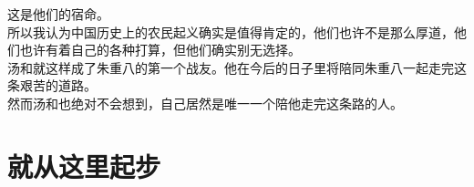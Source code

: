 \begin{multicols}{\theparacolNo}
这是他们的宿命。\\

所以我认为中国历史上的农民起义确实是值得肯定的，他们也许不是那么厚道，他们也许有着自己的各种打算，但他们确实别无选择。\\

汤和就这样成了朱重八的第一个战友。他在今后的日子里将陪同朱重八一起走完这条艰苦的道路。\\

然而汤和也绝对不会想到，自己居然是唯一一个陪他走完这条路的人。\\
\ifnum{}
	\end{multicols}
\fi
\newpage
\section{就从这里起步}
\ifnum{}
